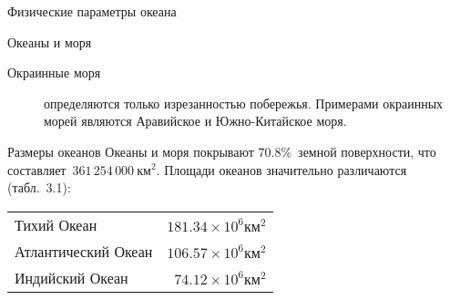 \begin{chapter}{Физические параметры океана}
\begin{section}{Океаны и моря}
\begin{description}
\item[Окраинные моря] определяются только изрезанностью побережья.
Примерами окраинных морей являются Аравийское и Южно-Китайское моря.
%
\end{description}
\end{section}


\begin{section}{Размеры океанов}
Океаны и моря покрывают $70.8\%$~земной поверхности, что 
составляет~$361\,254\,000~\mbox{км}^2$. Площади океанов значительно 
различаются (табл.~3.1):
%

\begin{tabular}{lr}
Тихий Океан         & $181.34 \times 10^6 \mbox{км}^2$ \\
Атлантический Океан & $106.57 \times 10^6 \mbox{км}^2$ \\
Индийский Океан     & $ 74.12 \times 10^6 \mbox{км}^2$ \\
\end{tabular}
%



\end{section}
\end{chapter}
